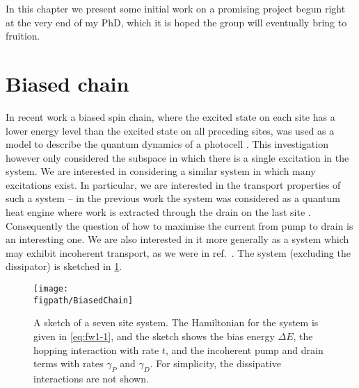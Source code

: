 In this chapter we present some initial work on a promising project begun right at the very end of my PhD, which it is hoped the group will eventually bring to fruition. 

\section{Biased chain}
In recent work a biased spin chain, where the excited state on each site has a lower energy level than the excited state on all preceding sites, was used as a model to describe the quantum dynamics of a photocell \cite{Fruchtman2016}. This investigation however only considered the subspace in which there is a single excitation in the system. We are interested in considering a similar system in which many excitations exist. In particular, we are interested in the transport properties of such a system -- in the previous work the system was considered as a quantum heat engine where work is extracted through the drain on the last site \cite{Dorfman2013}. Consequently the question of how to maximise the current from pump to drain is an interesting one. We are also interested in it more generally as a system which may exhibit incoherent transport, as we were in ref.~\cite{Owen2017}. The system (excluding the dissipator) is sketched in \cref{fig:fw1-1}.

\begin{figure}[ht!]
	\centering
	\texttt{[image: \\figpath/BiasedChain]}
	\caption{\label{fig:fw1-1}A sketch of a seven site system. The Hamiltonian for the system is given in \cref{eq:fw1-1}, and the sketch shows the bias energy \(\Delta E\), the hopping interaction with rate \(t\), and the incoherent pump and drain terms with rates \(\gamma_{P}\) and \(\gamma_{D}\). For simplicity, the dissipative interactions are not shown.}
\end{figure}

